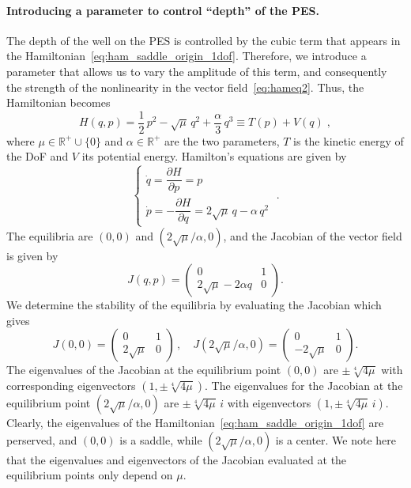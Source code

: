 \documentclass{ws-ijbc}
\begin{document}
\paragraph{Introducing a parameter to control ``depth'' of the PES.}

The depth of the well on the PES is controlled by the cubic term that appears in the Hamiltonian~\eqref{eq:ham_saddle_origin_1dof}. Therefore, we introduce a parameter that allows us to vary the amplitude of this term, and consequently the strength of the nonlinearity in the vector field~\eqref{eq:hameq2}. Thus, the Hamiltonian becomes
\begin{equation}
H(q,p) = \frac{1}{2} \, p^2 - \sqrt{\mu} \, q^2 + \frac{\alpha}{3} \, q^3 \equiv T(p) + V(q) \;,
\label{hameq_1dof_gen}
\end{equation}
where $\mu \in \mathbb{R}^{+} \cup \lbrace0\rbrace$ and $ \alpha \in \mathbb{R}^{+}$ are the two parameters, $T$ is the kinetic energy of the DoF and $V$ its potential energy. Hamilton's equations are given by
\begin{equation}
\begin{cases}
\dot{q} = \dfrac{\partial H}{\partial p} = p \\[.2cm]
\dot{p} = -\dfrac{\partial H}{\partial q} = 2\sqrt{\mu} \, q - \alpha \, q^2
\end{cases}
\;.
\label{eq:hameq_saddlenode_1dof}
\end{equation}
The equilibria are $(0,0)$ and $\left(2\sqrt{\mu}/ \alpha,0\right)$, and the Jacobian of the vector field is given by
\begin{equation}
J(q,p) = 
\begin{pmatrix}
0 & 1 \\
2 \sqrt{\mu} -2 \alpha q & 0
\end{pmatrix}.
\end{equation}
We determine the stability of the equilibria by evaluating the Jacobian which gives
\begin{equation}
J(0,0) = 
\begin{pmatrix}
0 & 1 \\
2 \sqrt{\mu} & 0
\end{pmatrix}
\,,\quad 
J\left(2\sqrt{\mu}/ \alpha,0\right) = 
\begin{pmatrix}
0 & 1 \\
-2 \sqrt{\mu} & 0
\end{pmatrix}.
\end{equation}
The eigenvalues of the Jacobian at the equilibrium point $(0,0)$ are $\pm \sqrt[4]{4\mu}$ with corresponding eigenvectors $(1,\pm \sqrt[4]{4\mu})$. The eigenvalues for the Jacobian at the equilibrium point $\left(2\sqrt{\mu}/ \alpha,0\right)$ are $\pm \sqrt[4]{4\mu} \, i$ with eigenvectors $(1,\pm \sqrt[4]{4\mu} \, i)$. Clearly, the eigenvalues of the Hamiltonian~\eqref{eq:ham_saddle_origin_1dof} are perserved, and $(0,0)$ is a saddle, while $\left(2\sqrt{\mu}/ \alpha,0\right)$ is a center. We note here that the eigenvalues and eigenvectors of the Jacobian evaluated at the equilibrium points only depend on $\mu$. 
\end{document}
